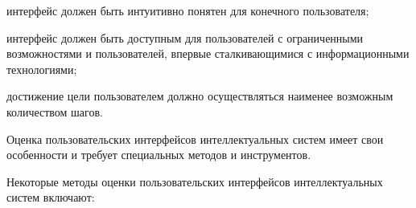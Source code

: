 \begin{textitemize}
	\item интерфейс должен быть интуитивно понятен для конечного пользователя;
	\item интерфейс должен быть доступным для пользователей с ограниченными возможностями и пользователей, впервые сталкивающимися с информационными технологиями;
	\item достижение цели пользователем должно осуществляться наименее возможным количеством шагов.
\end{textitemize}


Оценка пользовательских интерфейсов интеллектуальных систем имеет свои особенности и требует специальных методов и инструментов.

Некоторые методы оценки пользовательских интерфейсов интеллектуальных систем включают:
